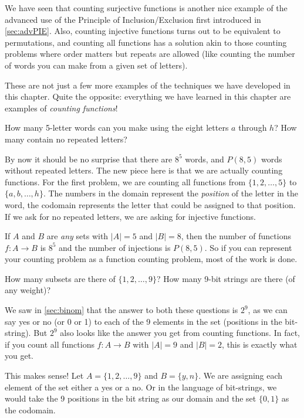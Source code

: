 \documentclass[12pt]{article}
\begin{document}
We have seen that counting surjective functions is another nice example of the advanced use of the Principle of Inclusion/Exclusion first introduced in \autoref{sec:advPIE}.  Also, counting injective functions turns out to be equivalent to permutations, and counting all functions has a solution akin to those counting problems where order matters but repeats are allowed (like counting the number of words you can make from a given set of letters).  

These are not just a few more examples of the techniques we have developed in this chapter.  Quite the opposite: everything we have learned in this chapter are examples of \emph{counting functions}!

\begin{example}
How many 5-letter words can you make using the eight letters $a$ through $h$?  How many contain no repeated letters?

\begin{solution}
By now it should be no surprise that there are $8^5$ words, and $P(8,5)$ words without repeated letters.  The new piece here is that we are actually counting functions.  For the first problem, we are counting all functions from $\{1,2,\ldots, 5\}$ to $\{a,b,\ldots, h\}$.  The numbers in the domain represent the \emph{position} of the letter in the word, the codomain represents the letter that could be assigned to that position.  If we ask for no repeated letters, we are asking for injective functions.

If $A$ and $B$ are \emph{any} sets with $|A| = 5$ and $|B| = 8$, then the number of functions $f: A \to B$ is $8^5$ and the number of injections is $P(8,5)$.  So if you can represent your counting problem as a function counting problem, most of the work is done.
\end{solution}
\end{example} 


\begin{example}
How many subsets are there of $\{1,2,\ldots, 9\}$?  How many 9-bit strings are there (of any weight)?

\begin{solution}
We saw in \autoref{sec:binom} that the answer to both these questions is $2^9$, as we can say yes or no (or 0 or 1) to each of the 9 elements in the set (positions in the bit-string).  But $2^9$ also looks like the answer you get from counting functions.  In fact, if you count all functions $f: A \to B$ with $|A| = 9$ and $|B| = 2$, this is exactly what you get.  

This makes sense!  Let $A = \{1,2,\ldots, 9\}$ and $B = \{y, n\}$.  We are assigning each element of the set either a yes or a no.  Or in the language of bit-strings, we would take the 9 positions in the bit string as our domain and the set $\{0,1\}$ as the codomain.
\end{solution}
\end{example}
 
\end{document}
